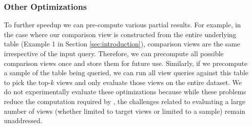 \subsubsection{Other Optimizations}
To further speedup \VizRecDB we can pre-compute various partial results.
For example, in the case where our comparison view is constructed from the
  entire underlying table (Example 1 in Section \ref{sec:introduction}),
  comparison views are the same irrespective of the input query.
Therefore, we can precompute all possible comparison views once and store
  them for future use. 
%   
Similarly, if we precompute a sample of the table being queried, we can run
all view queries against this table to pick the top-$k$ views and only evaluate
those views on the entire dataset.
We do not experimentally evaluate these optimizations because while these
problems reduce the computation required by \VizRecDB, the
challenges related to evaluating a large number of views (whether limited to
target views or limited to a sample) remain unaddressed.

